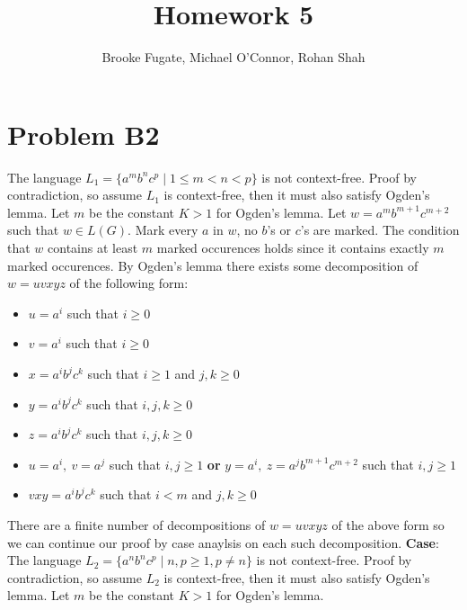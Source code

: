 \documentclass[12pt]{article}
\begin{document}
\pagestyle{plain}
\titleformat{\subsection}[runin]
  {\normalfont\large\bfseries}{\thesubsection}{1em}{}

\title{Homework 5}
\author{Brooke Fugate, Michael O'Connor, Rohan Shah}
\date{}

\maketitle

\section*{Problem B2}
The language $L_1 = \{a^mb^nc^p \mid 1\le m<n<p\}$ is not context-free. Proof by
contradiction, so assume $L_1$ is context-free, then it must also satisfy
Ogden's lemma. Let $m$ be the constant $K > 1$ for Ogden's lemma. Let
$w = a^mb^{m+1}c^{m+2}$ such that $w \in L(G)$. Mark every $a$ in $w$,
no $b$'s or $c$'s are marked. The condition that $w$ contains at least $m$
marked occurences holds since it contains exactly $m$ marked occurences.
By Ogden's lemma there exists some decomposition of $w = uvxyz$ of the
following form:
\begin{itemize}
\item $u=a^i$ such that $i\ge 0$
\item $v=a^i$ such that $i\ge 0$
\item $x=a^ib^jc^k$ such that $i\ge 1$ and $j,k\ge 0$
\item $y=a^ib^jc^k$ such that $i,j,k\ge 0$
\item $z=a^ib^jc^k$ such that $i,j,k\ge 0$
\item $u=a^i,\ v=a^j$ such that $i,j\ge 1$ \textbf{or}
$y=a^i,\ z=a^jb^{m+1}c^{m+2}$ such that $i,j\ge 1$
\item $vxy = a^ib^jc^k$ such that $i<m$ and $j,k\ge 0$
\end{itemize}
There are a finite number of decompositions of $w=uvxyz$ of the above form so we
can continue our proof by case anaylsis on each such decomposition.
\vspace{3mm}
\newline
\textbf{Case}:
\newpage
The language $L_2 = \{a^nb^nc^p \mid n,p\ge 1, p\neq n\}$ is not context-free.
Proof by contradiction, so assume $L_2$ is context-free, then it must also
satisfy Ogden's lemma. Let $m$ be the constant $K > 1$ for Ogden's lemma.
\end{document}
